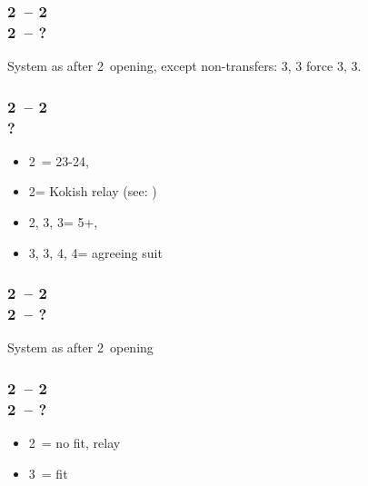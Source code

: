 \documentclass[12pt, a4paper]{article}
\begin{document}
\subsubsection*{2\clubs\ -- 2\hearts \\ 2\nt\ -- ?}
System as after 2\nt\ opening, except non-\gf transfers: 3\diams, 3\hearts
force 3\hearts, 3\spades.

\subsubsection*{2\clubs\ -- 2\diams \\ ?}
\begin{itemize}
    \item 2\nt\ = 23-24, \bal
    \item 2\hearts = Kokish relay (see: {})
    \item 2\spades, 3\clubs, 3\diams = 5+, \unbal
    \item 3\hearts, 3\spades, 4\clubs, 4\diams = agreeing suit
\end{itemize}

\subsubsection*{2\clubs\ -- 2\diams \\ 2\nt\ -- ?}
System as after 2\nt\ opening


\subsubsection*{2\clubs\ -- 2\diams \\ 2\spades\ -- ?}
\begin{itemize}
    \item 2\nt\ = no fit, relay
    \item 3\spades\ = fit
\end{itemize}
\end{document}
